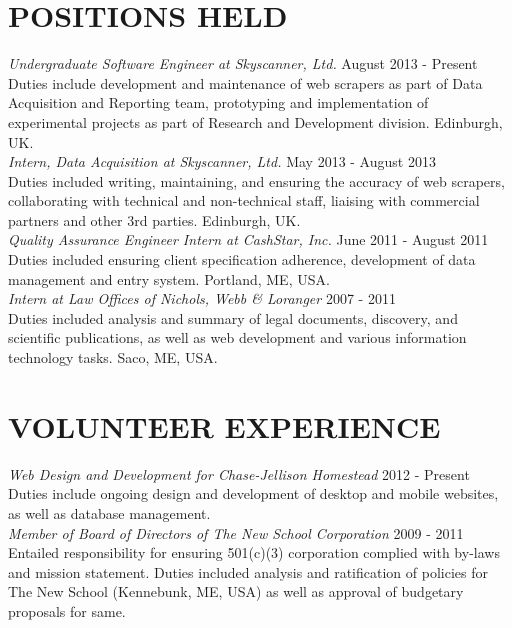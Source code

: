 \documentclass[line, margin]{res}
\begin{document}
\begin{resume}
\section{POSITIONS HELD}
\textit{Undergraduate Software Engineer at Skyscanner, Ltd.} \hfill August 2013 - Present \\
Duties include development and maintenance of web scrapers as part of Data Acquisition and Reporting team, prototyping and implementation of experimental projects as part of Research and Development division. Edinburgh, UK.\\[5pt]
\textit{Intern, Data Acquisition at Skyscanner, Ltd.} \hfill May 2013 - August 2013 \\
Duties included writing, maintaining, and ensuring the accuracy of web scrapers, collaborating with technical and non-technical staff, liaising with commercial partners and other 3rd parties. Edinburgh, UK.\\[5pt]
\textit{Quality Assurance Engineer Intern at CashStar, Inc.} \hfill June 2011 - August 2011 \\
Duties included ensuring client specification adherence, development of data management and entry system. Portland, ME, USA.\\[5pt]
\textit{Intern at Law Offices of Nichols, Webb \& Loranger} \hfill 2007 - 2011 \\
Duties included analysis and summary of legal documents, discovery, and scientific publications, as well as web development and various information technology tasks. Saco, ME, USA.

\section{VOLUNTEER EXPERIENCE}
\textit{Web Design and Development for Chase-Jellison Homestead} \hfill 2012 - Present \\
Duties include ongoing design and development of desktop and mobile websites, as well as database management. \\[5pt]
\textit{Member of Board of Directors of The New School Corporation} \hfill 2009 - 2011 \\
Entailed responsibility for ensuring 501(c)(3) corporation complied with by-laws and mission statement. Duties included analysis and ratification of policies for The New School (Kennebunk, ME, USA) as well as approval of budgetary proposals for same. 


\end{resume}
\end{document}
